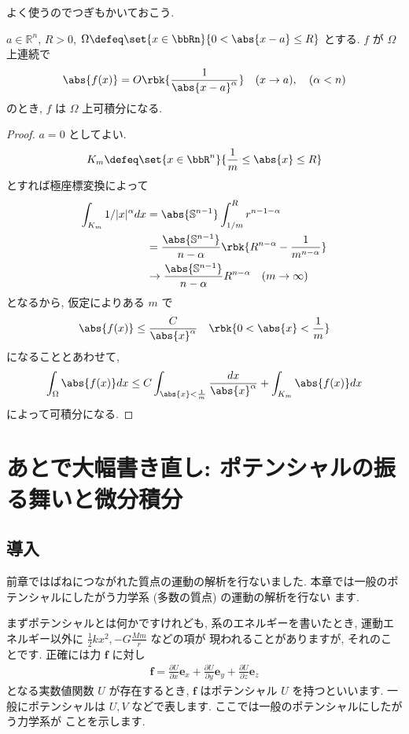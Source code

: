 \documentclass[openany, a4paper, oneside]{jsbook}
\begin{document}
よく使うのでつぎもかいておこう.
\begin{thm}
$a \in \mathbb{R}^n$, $R > 0$, $\Omega \defeq \set{x \in \bbRn}{0 < \abs{x - a} \le R}$ とする.
$f$ が $\Omega$ 上連続で
\begin{align}
 \abs{f(x)}
 =
 O \rbk{\frac{1}{\abs{x - a}^{\alpha}}} \quad (x \to a), \quad (\alpha < n)
\end{align}
のとき, $f$ は $\Omega$ 上可積分になる.
\end{thm}
\begin{proof}
$a=0$ としてよい.
\begin{align}
 K_m
 \defeq
 \set{x \in \bbR^n}{\frac{1}{m} \le \abs{x} \le R}
\end{align}
とすれば極座標変換によって
\begin{align}
 \int_{K_m} 1/{|x|^{\alpha}} dx
 &=
 \abs{\mathbb{S}^{n-1}} \int_{1/m}^R r^{n-1-\alpha} \\
 &=
 \frac{\abs{\mathbb{S}^{n-1}}}{n - \alpha} \rbk{R^{n-\alpha} - \frac{1}{m^{n-\alpha}}} \\
 &\to
 \frac{\abs{\mathbb{S}^{n-1}}}{n-\alpha} R^{n-\alpha} \quad (m \to \infty)
\end{align}
となるから, 仮定によりある $m$ で
\begin{align}
 \abs{f(x)}
 \le
 \frac{C}{\abs{x}^{\alpha}} \quad \rbk{0 < \abs{x} < \frac{1}{m}}
\end{align}
になることとあわせて,
\begin{align}
 \int_{\Omega} \abs{f(x)} dx
 \le
 C \int_{\abs{x} < \frac{1}{m}} \frac{dx}{\abs{x}^{\alpha}} + \int_{K_m} \abs{f(x)} dx
\end{align}
によって可積分になる.
\end{proof}
\chapter{あとで大幅書き直し: ポテンシャルの振る舞いと微分積分}

\section{導入}

前章ではばねにつながれた質点の運動の解析を行ないました.
本章では一般のポテンシャルにしたがう力学系 (多数の質点) の運動の解析を行ない
ます.

まずポテンシャルとは何かですけれども,
系のエネルギーを書いたとき, 運動エネルギー以外に
$\frac{1}{2}kx^2,-G\frac{Mm}{r}$ などの項が
現われることがありますが, それのことです.
正確には力 $\bm{f}$ に対し
\begin{align}
\bm{f} =
\frac{ \partial U }{\partial x}\bm{e}_{x} + \frac{ \partial U}{\partial y}\bm{e}_{y} +
\frac{ \partial U}{\partial z}\bm{e}_{z}
\end{align}
となる実数値関数 $U$ が存在するとき,  $\bm{f}$ はポテンシャル $U$ を持つといいます.
一般にポテンシャルは $U,V$ などで表します.
ここでは一般のポテンシャルにしたがう力学系が
ことを示します.
\end{document}
